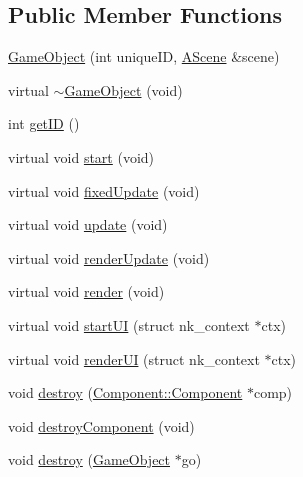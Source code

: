 \subsection*{Public Member Functions}
\begin{DoxyCompactItemize}
\item 
\mbox{\hyperlink{class_beer_engine_1_1_game_object_a4b23814e19c3dabc407594419d396a41}{Game\+Object}} (int unique\+ID, \mbox{\hyperlink{class_beer_engine_1_1_a_scene}{A\+Scene}} \&scene)
\item 
virtual \mbox{\hyperlink{class_beer_engine_1_1_game_object_a7e5c50ce01ec2831aaf489271a77297e}{$\sim$\+Game\+Object}} (void)
\item 
int \mbox{\hyperlink{class_beer_engine_1_1_game_object_a36782b2d17c0e576ab740903c5cfeab0}{get\+ID}} ()
\item 
virtual void \mbox{\hyperlink{class_beer_engine_1_1_game_object_a2caa6e6105c6766fdac3688ff1e74f00}{start}} (void)
\item 
virtual void \mbox{\hyperlink{class_beer_engine_1_1_game_object_a8a27a6cc9c9963366fbae264e4f14f97}{fixed\+Update}} (void)
\item 
virtual void \mbox{\hyperlink{class_beer_engine_1_1_game_object_ab53f4154cb5cecd0b1238465f7d1fc81}{update}} (void)
\item 
virtual void \mbox{\hyperlink{class_beer_engine_1_1_game_object_a3b1a996713890a49cc4c9a7aa014e190}{render\+Update}} (void)
\item 
virtual void \mbox{\hyperlink{class_beer_engine_1_1_game_object_ac74ff77a1e62e76eff1247c4d3daaa33}{render}} (void)
\item 
virtual void \mbox{\hyperlink{class_beer_engine_1_1_game_object_a2913798eee7a983d3e6da0cf78d29752}{start\+UI}} (struct nk\+\_\+context $\ast$ctx)
\item 
virtual void \mbox{\hyperlink{class_beer_engine_1_1_game_object_a41ec8584219fff4d65de2b39e080fff9}{render\+UI}} (struct nk\+\_\+context $\ast$ctx)
\item 
void \mbox{\hyperlink{class_beer_engine_1_1_game_object_a6d05e99954dfbdab2eb2102d71d9a364}{destroy}} (\mbox{\hyperlink{class_beer_engine_1_1_component_1_1_component}{Component\+::\+Component}} $\ast$comp)
\item 
void \mbox{\hyperlink{class_beer_engine_1_1_game_object_affa35f94189065985a5cded85bda7d66}{destroy\+Component}} (void)
\item 
void \mbox{\hyperlink{class_beer_engine_1_1_game_object_a69de7e42efb9e30ce00de85a35121309}{destroy}} (\mbox{\hyperlink{class_beer_engine_1_1_game_object}{Game\+Object}} $\ast$go)

\end{DoxyCompactItemize}
